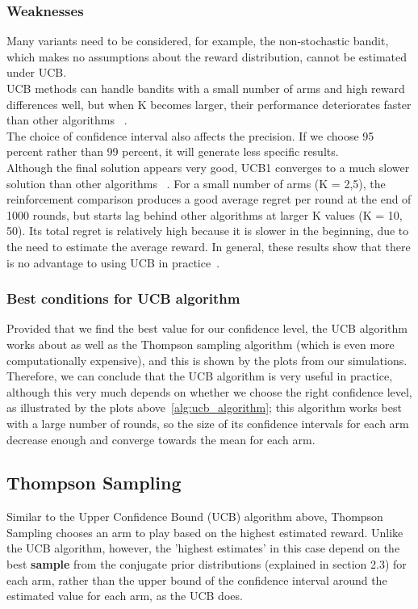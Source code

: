 \subsubsection{Weaknesses}
Many variants need to be considered, for example, the non-stochastic bandit, which makes no assumptions about the reward distribution, cannot be estimated under UCB\@.
\\UCB methods can handle bandits with a small number of arms and high reward differences well, but when K becomes larger, their performance deteriorates faster than other algorithms ~\citep{kuleshov}.
\\The choice of confidence interval also affects the precision.
If we choose 95 percent rather than 99 percent, it will generate less specific results.
\\Although the final solution appears very good, UCB1 converges to a much slower solution than other algorithms ~\citep{Auer2002}.
For a small number of arms (K = 2,5), the reinforcement comparison produces a good average regret per round at the end of 1000 rounds, but starts lag behind other algorithms at larger K values (K = 10, 50).
Its total regret is relatively high because it is slower in the beginning, due to the need to estimate the average reward.
In general, these results show that there is no advantage to using UCB in practice~\citep{kuleshov}.

\subsubsection{Best conditions for UCB algorithm}
Provided that we find the best value for our confidence level, the UCB algorithm works about as well as the Thompson sampling algorithm (which is even more computationally expensive), and this is shown by the plots from our simulations.
Therefore, we can conclude that the UCB algorithm is very useful in practice, although this very much depends on whether we choose the right confidence level, as illustrated by the plots above~\ref{alg:ucb_algorithm}; this algorithm works best with a large number of rounds, so the size of its confidence intervals for each arm decrease enough and converge towards the mean for each arm.

\subsection{Thompson Sampling}\label{subsec:thompson-sampling}
Similar to the Upper Confidence Bound (UCB) algorithm above, Thompson Sampling chooses an arm to play based on the highest estimated reward.
Unlike the UCB algorithm, however, the 'highest estimates' in this case depend on the best \textbf{sample} from the conjugate prior distributions (explained in section 2.3) for each arm, rather than the upper bound of the confidence interval around the estimated value for each arm, as the UCB does.

